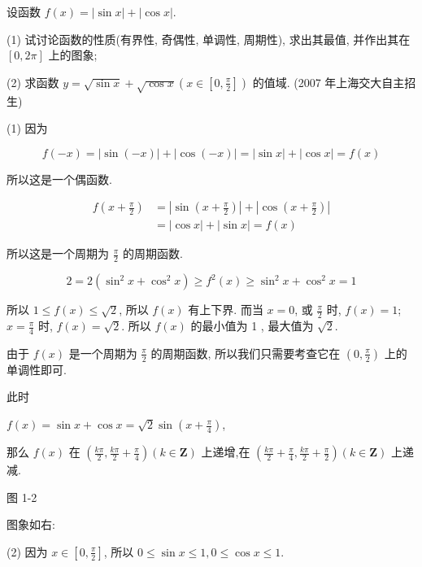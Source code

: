 \begin{example}
	设函数 $f(x)=|\sin x|+|\cos x|$.

	(1) 试讨论函数的性质(有界性, 奇偶性, 单调性, 周期性), 求出其最值, 并作出其在 $[0,2 \pi]$ 上的图象;

	(2) 求函数 $y=\sqrt{\sin x}+\sqrt{\cos x}\left(x \in\left[0, \frac{\pi}{2}\right]\right)$ 的值域. (2007 年上海交大自主招生)

\end{example}
\begin{solution}
	(1) 因为

	$$
		f(-x)=|\sin (-x)|+|\cos (-x)|=|\sin x|+|\cos x|=f(x)
	$$

	所以这是一个偶函数.

	$$
		\begin{aligned}
			f\left(x+\frac{\pi}{2}\right) & =\left|\sin \left(x+\frac{\pi}{2}\right)\right|+\left|\cos \left(x+\frac{\pi}{2}\right)\right| \\
			                              & =|\cos x|+|\sin x|=f(x)
		\end{aligned}
	$$

	所以这是一个周期为 $\frac{\pi}{2}$ 的周期函数.

	$$
		2=2\left(\sin ^{2} x+\cos ^{2} x\right) \geqslant f^{2}(x) \geqslant \sin ^{2} x+\cos ^{2} x=1
	$$

	所以 $1 \leqslant f(x) \leqslant \sqrt{2}$, 所以 $f(x)$ 有上下界. 而当 $x=0$, 或 $\frac{\pi}{2}$ 时, $f(x)=1$;\\
	$x=\frac{\pi}{4}$ 时, $f(x)=\sqrt{2}$. 所以 $f(x)$ 的最小值为 1 , 最大值为 $\sqrt{2}$.

	由于 $f(x)$ 是一个周期为 $\frac{\pi}{2}$ 的周期函数, 所以我们只需要考查它在 $\left(0, \frac{\pi}{2}\right)$ 上的单调性即可.

	此时

	$f(x)=\sin x+\cos x=\sqrt{2} \sin \left(x+\frac{\pi}{4}\right)$,

	那么 $f(x)$ 在 $\left(\frac{k \pi}{2}, \frac{k \pi}{2}+\frac{\pi}{4}\right)(k \in \mathbf{Z})$ 上递增,在 $\left(\frac{k \pi}{2}+\frac{\pi}{4}, \frac{k \pi}{2}+\frac{\pi}{2}\right)(k \in \mathbf{Z})$ 上递减.


	图 1-2

	图象如右:

	(2) 因为 $x \in\left[0, \frac{\pi}{2}\right]$, 所以 $0 \leqslant \sin x \leqslant 1,0 \leqslant \cos x \leqslant 1$.


\end{solution}
